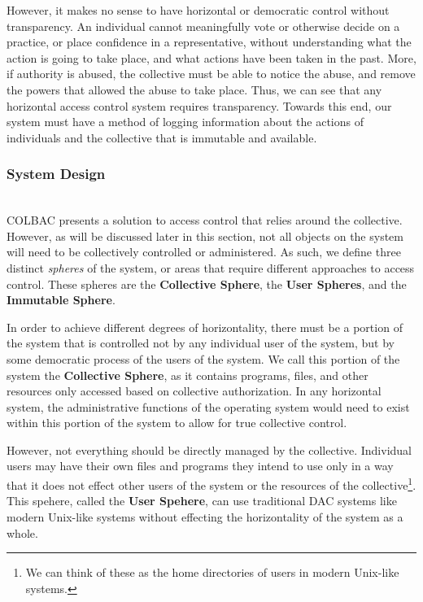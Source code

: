 However, it makes no sense to have horizontal or democratic control without
transparency. An individual cannot meaningfully vote or otherwise decide on a
practice, or place confidence in a representative, without understanding what
the action is going to take place, and what actions have been taken in the past.
More, if authority is abused, the collective must be able to notice the abuse,
and remove the powers that allowed the abuse to take place. Thus, we can see
that any horizontal access control system requires transparency. Towards this
end, our system must have a method of logging information about the actions of
individuals and the collective that is immutable and available.

\subsubsection{System Design}
\mbox{}\\
COLBAC presents a solution to access control that relies around the collective.
However, as will be discussed later in this section, not all objects on the
system will need to be collectively controlled or administered. As such, we
define three distinct \textit{spheres} of the system, or areas that require
different approaches to access control. These spheres are the \textbf{Collective
Sphere}, the \textbf{User Spheres}, and the \textbf{Immutable Sphere}.

In order to achieve different degrees of horizontality, there must be a portion
of the system that is controlled not by any individual user of the system, but
by some democratic process of the users of the system. We call this portion of
the system the \textbf{Collective Sphere}, as it contains programs, files, and
other resources only accessed based on collective authorization. In any
horizontal system, the administrative functions of the operating system would
need to exist within this portion of the system to allow for true collective
control.

However, not everything should be directly managed by the collective. Individual
users may have their own files and programs they intend to use only in a way
that it does not effect other users of the system or the resources of the
collective\footnote{We can think of these as the home directories of users in
modern Unix-like systems.}. This spehere, called the \textbf{User Spehere},
can use traditional DAC systems like modern Unix-like systems without effecting
the horizontality of the system as a whole.

